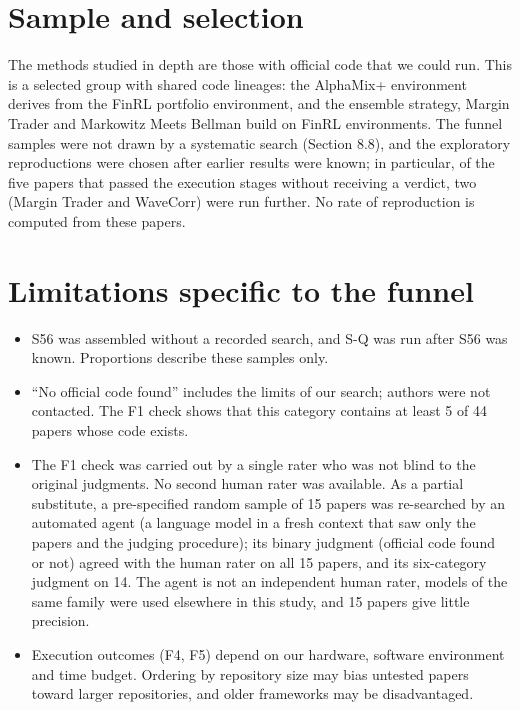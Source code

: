 \documentclass[12pt,a4paper]{report}
\providecommand{\tightlist}{\setlength{\itemsep}{0pt}\setlength{\parskip}{0pt}}
\begin{document}
\section{Sample and selection}\label{sample-and-selection}

The methods studied in depth are those with official code that we could
run. This is a selected group with shared code lineages: the AlphaMix+
environment derives from the FinRL portfolio environment, and the
ensemble strategy, Margin Trader and Markowitz Meets Bellman build on
FinRL environments. The funnel samples were not drawn by a systematic
search (Section 8.8), and the exploratory reproductions were chosen
after earlier results were known; in particular, of the five papers that
passed the execution stages without receiving a verdict, two (Margin
Trader and WaveCorr) were run further. No rate of reproduction is
computed from these papers.

\section{Limitations specific to the
funnel}\label{limitations-specific-to-the-funnel}

\begin{itemize}
\tightlist
\item
  S56 was assembled without a recorded search, and S-Q was run after S56
  was known. Proportions describe these samples only.
\item
  ``No official code found'' includes the limits of our search; authors
  were not contacted. The F1 check shows that this category contains at
  least 5 of 44 papers whose code exists.
\item
  The F1 check was carried out by a single rater who was not blind to
  the original judgments. No second human rater was available. As a
  partial substitute, a pre-specified random sample of 15 papers was
  re-searched by an automated agent (a language model in a fresh context
  that saw only the papers and the judging procedure); its binary
  judgment (official code found or not) agreed with the human rater on
  all 15 papers, and its six-category judgment on 14. The agent is not
  an independent human rater, models of the same family were used
  elsewhere in this study, and 15 papers give little precision.
\item
  Execution outcomes (F4, F5) depend on our hardware, software
  environment and time budget. Ordering by repository size may bias
  untested papers toward larger repositories, and older frameworks may
  be disadvantaged.
\end{itemize}
\end{document}
